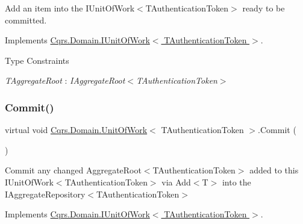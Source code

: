 Add an item into the I\+Unit\+Of\+Work$<$\+T\+Authentication\+Token$>$ ready to be committed. 



Implements \hyperlink{interfaceCqrs_1_1Domain_1_1IUnitOfWork_a1899165061529d5c9e77429b1fa72189_a1899165061529d5c9e77429b1fa72189}{Cqrs.\+Domain.\+I\+Unit\+Of\+Work$<$ T\+Authentication\+Token $>$}.

\begin{Desc}
\item[Type Constraints]\begin{description}
\item[{\em T\+Aggregate\+Root} : {\em I\+Aggregate\+Root$<$T\+Authentication\+Token$>$}]\end{description}
\end{Desc}
\mbox{\label{classCqrs_1_1Domain_1_1UnitOfWork_a132dd26611fc71d676727f71f1412edd_a132dd26611fc71d676727f71f1412edd}} 
\subsubsection{\texorpdfstring{Commit()}{Commit()}}
{\footnotesize\ttfamily virtual void \hyperlink{classCqrs_1_1Domain_1_1UnitOfWork}{Cqrs.\+Domain.\+Unit\+Of\+Work}$<$ T\+Authentication\+Token $>$.Commit (\begin{DoxyParamCaption}{ }\end{DoxyParamCaption})\hspace{0.3cm}{\ttfamily [virtual]}}



Commit any changed Aggregate\+Root$<$\+T\+Authentication\+Token$>$ added to this I\+Unit\+Of\+Work$<$\+T\+Authentication\+Token$>$ via Add$<$\+T$>$ into the I\+Aggregate\+Repository$<$\+T\+Authentication\+Token$>$ 



Implements \hyperlink{interfaceCqrs_1_1Domain_1_1IUnitOfWork_ade600c9bf9e8380c24eaf1e7e0df6e01_ade600c9bf9e8380c24eaf1e7e0df6e01}{Cqrs.\+Domain.\+I\+Unit\+Of\+Work$<$ T\+Authentication\+Token $>$}.

\mbox{\label{classCqrs_1_1Domain_1_1UnitOfWork_a72f0ec98b1ea4b74af7d0daa5cb73c03_a72f0ec98b1ea4b74af7d0daa5cb73c03}} 
